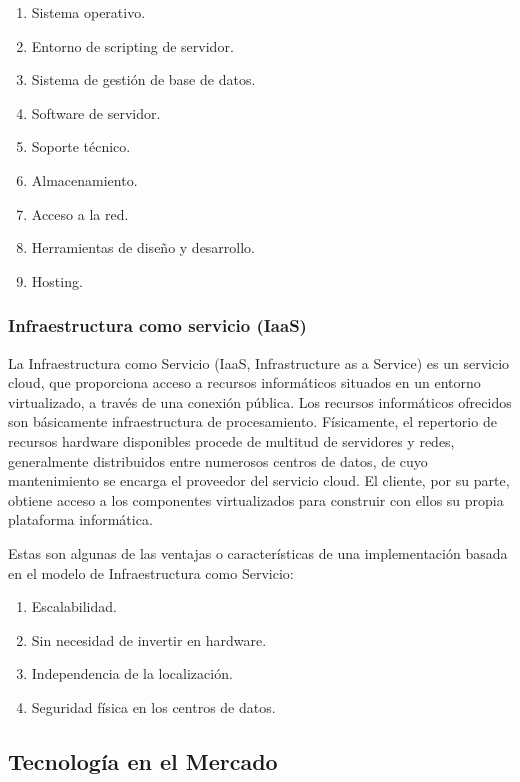 \documentclass[a4paper,11pt]{book}
\begin{document}
\begin{enumerate}
\item Sistema operativo.
\item Entorno de scripting de servidor.
\item Sistema de gestión de base de datos.
\item Software de servidor.
\item Soporte técnico.
\item Almacenamiento.
\item Acceso a la red.
\item Herramientas de diseño y desarrollo.
\item Hosting.
\end{enumerate}

\subsubsection{Infraestructura como servicio (IaaS)}

La Infraestructura como Servicio\cite{iaas} (IaaS, Infrastructure as a Service) es un servicio cloud, que proporciona acceso a recursos informáticos situados en un entorno virtualizado, a través de una conexión pública. Los recursos informáticos ofrecidos  son básicamente infraestructura de procesamiento. Físicamente, el repertorio de recursos hardware disponibles procede de multitud de servidores y redes, generalmente distribuidos entre numerosos centros de datos, de cuyo mantenimiento se encarga el proveedor del servicio cloud. El cliente, por su parte, obtiene acceso a los componentes virtualizados para construir con ellos su propia plataforma informática.

Estas son algunas de las ventajas o características de una implementación basada en el modelo de Infraestructura como Servicio:

\begin{enumerate}
\item Escalabilidad.
\item Sin necesidad de invertir en hardware.
\item Independencia de la localización.
\item Seguridad física en los centros de datos.
\end{enumerate}

\subsection{Tecnología en el Mercado}\label{mercado}
\end{document}
